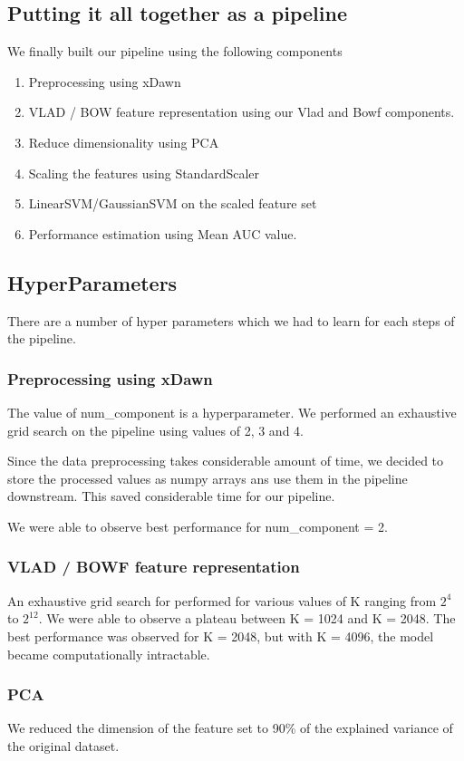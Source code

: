 \documentclass[final,leqno,onefignum,onetabnum]{siamltexmm}
\begin{document}
\subsection{Putting it all together as a pipeline}
We finally built our pipeline using the following components
  \begin{enumerate}
    \item Preprocessing using xDawn
    \item VLAD / BOW feature representation using our Vlad and Bowf components.
    \item Reduce dimensionality using PCA
    \item Scaling the features using StandardScaler
    \item LinearSVM/GaussianSVM on the scaled feature set
    \item Performance estimation using Mean AUC value.
  \end{enumerate}
\subsection{HyperParameters}
There are a number of hyper parameters which we had to learn for each steps of the pipeline.
\subsubsection{Preprocessing using xDawn}
The value of num\_component is a hyperparameter.  We performed an exhaustive grid search on the pipeline using values of 2, 3 and 4.

Since the data preprocessing takes considerable amount of time, we decided to store the processed values as numpy arrays ans use them in the pipeline downstream.  This saved considerable time for our pipeline.

We were able to observe best performance for num\_component = 2.


\subsubsection{VLAD / BOWF feature representation}
An exhaustive grid search for performed for various values of K ranging from $2^{4}$ to $2^{12}$.
We were able to observe a plateau between K = 1024 and K = 2048.  The best performance was observed for K = 2048, but with K = 4096, the model became computationally intractable.

\subsubsection{PCA}
We reduced the dimension of the feature set to 90\% of the explained variance of the original dataset.
\end{document}

